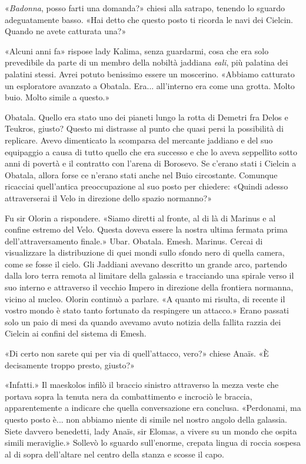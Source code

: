 «\emph{Badonna}, posso farti una domanda?» chiesi alla satrapo, tenendo
lo sguardo adeguatamente basso. «Hai detto che questo posto ti ricorda
le navi dei Cielcin. Quando ne avete catturata una?»

«Alcuni anni fa» rispose lady Kalima, senza guardarmi, cosa che era solo
prevedibile da parte di un membro della nobiltà jaddiana \emph{eali},
più palatina dei palatini stessi. Avrei potuto benissimo essere un
moscerino. «Abbiamo catturato un esploratore avanzato a Obatala. Era...
all'interno era come una grotta. Molto buio. Molto simile a questo.»

Obatala. Quello era stato uno dei pianeti lungo la rotta di Demetri fra
Delos e Teukros, giusto? Questo mi distrasse al punto che quasi persi la
possibilità di replicare. Avevo dimenticato la scomparsa del mercante
jaddiano e del suo equipaggio a causa di tutto quello che era successo e
che lo aveva seppellito sotto anni di povertà e il contratto con l'arena
di Borosevo. Se c'erano stati i Cielcin a Obatala, allora forse ce
n'erano stati anche nel Buio circostante. Comunque ricacciai
quell'antica preoccupazione al suo posto per chiedere: «Quindi adesso
attraverserai il Velo in direzione dello spazio normanno?»

Fu sir Olorin a rispondere. «Siamo diretti al fronte, al di là di
Marinus e al confine estremo del Velo. Questa doveva essere la nostra
ultima fermata prima dell'attraversamento finale.» Ubar. Obatala. Emesh.
Marinus. Cercai di visualizzare la distribuzione di quei mondi sullo
sfondo nero di quella camera, come se fosse il cielo. Gli Jaddiani
avevano descritto un grande arco, partendo dalla loro terra remota al
limitare della galassia e tracciando una spirale verso il suo interno e
attraverso il vecchio Impero in direzione della frontiera normanna,
vicino al nucleo. Olorin continuò a parlare. «A quanto mi risulta, di
recente il vostro mondo è stato tanto fortunato da respingere un
attacco.» Erano passati solo un paio di mesi da quando avevamo avuto
notizia della fallita razzia dei Cielcin ai confini del sistema di
Emesh.

«Di certo non sarete qui per via di quell'attacco, vero?» chiese Anaïs.
«È decisamente troppo presto, giusto?»

«Infatti.» Il maeskolos infilò il braccio sinistro attraverso la mezza
veste che portava sopra la tenuta nera da combattimento e incrociò le
braccia, apparentemente a indicare che quella conversazione era
conclusa. «Perdonami, ma questo posto è... non abbiamo niente di simile
nel nostro angolo della galassia. Siete davvero benedetti, lady Anaïs,
sir Elomas, a vivere su un mondo che ospita simili meraviglie.» Sollevò
lo sguardo sull'enorme, crepata lingua di roccia sospesa al di sopra
dell'altare nel centro della stanza e scosse il capo.

